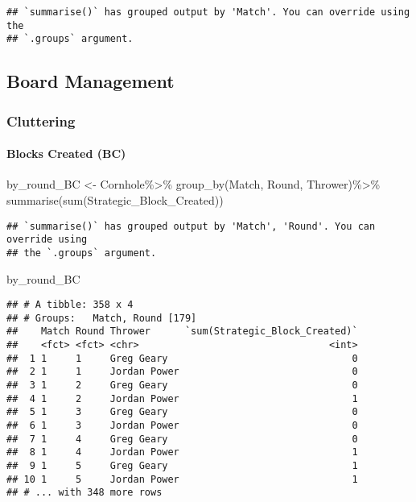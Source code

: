 \documentclass[
]{article}
\newenvironment{Shaded}{\begin{snugshade}}{\end{snugshade}}
\newcommand{\FunctionTok}[1]{\textcolor[rgb]{0.00,0.00,0.00}{#1}}
\newcommand{\NormalTok}[1]{#1}
\newcommand{\OtherTok}[1]{\textcolor[rgb]{0.56,0.35,0.01}{#1}}
\newcommand{\SpecialCharTok}[1]{\textcolor[rgb]{0.00,0.00,0.00}{#1}}
\begin{document}
\begin{verbatim}
## `summarise()` has grouped output by 'Match'. You can override using the
## `.groups` argument.
\end{verbatim}

\hypertarget{board-management}{%
\subsection{Board Management}\label{board-management}}

\hypertarget{cluttering}{%
\subsubsection{Cluttering}\label{cluttering}}

\hypertarget{blocks-created-bc}{%
\paragraph{Blocks Created (BC)}\label{blocks-created-bc}}

\begin{Shaded}
\begin{Highlighting}[]
\NormalTok{by\_round\_BC }\OtherTok{\textless{}{-}}\NormalTok{ Cornhole}\SpecialCharTok{\%\textgreater{}\%}
  \FunctionTok{group\_by}\NormalTok{(Match, Round, Thrower)}\SpecialCharTok{\%\textgreater{}\%}
  \FunctionTok{summarise}\NormalTok{(}\FunctionTok{sum}\NormalTok{(Strategic\_Block\_Created))}
\end{Highlighting}
\end{Shaded}

\begin{verbatim}
## `summarise()` has grouped output by 'Match', 'Round'. You can override using
## the `.groups` argument.
\end{verbatim}

\begin{Shaded}
\begin{Highlighting}[]
\NormalTok{by\_round\_BC}
\end{Highlighting}
\end{Shaded}

\begin{verbatim}
## # A tibble: 358 x 4
## # Groups:   Match, Round [179]
##    Match Round Thrower      `sum(Strategic_Block_Created)`
##    <fct> <fct> <chr>                                 <int>
##  1 1     1     Greg Geary                                0
##  2 1     1     Jordan Power                              0
##  3 1     2     Greg Geary                                0
##  4 1     2     Jordan Power                              1
##  5 1     3     Greg Geary                                0
##  6 1     3     Jordan Power                              0
##  7 1     4     Greg Geary                                0
##  8 1     4     Jordan Power                              1
##  9 1     5     Greg Geary                                1
## 10 1     5     Jordan Power                              1
## # ... with 348 more rows
\end{verbatim}
\end{document}
